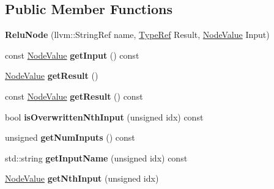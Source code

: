 \subsection*{Public Member Functions}
\begin{DoxyCompactItemize}
\item 
\mbox{\label{classglow_1_1_relu_node_a4f251464ab5d131dcda22503a07b83fc}} 
{\bfseries Relu\+Node} (llvm\+::\+String\+Ref name, \hyperlink{structglow_1_1_type}{Type\+Ref} Result, \hyperlink{structglow_1_1_node_value}{Node\+Value} Input)
\item 
\mbox{\label{classglow_1_1_relu_node_a3f6b472bb85c825b7d90bbb9b080f7a8}} 
const \hyperlink{structglow_1_1_node_value}{Node\+Value} {\bfseries get\+Input} () const
\item 
\mbox{\label{classglow_1_1_relu_node_a832e2ca58e460b8799f0ff73623217e8}} 
\hyperlink{structglow_1_1_node_value}{Node\+Value} {\bfseries get\+Result} ()
\item 
\mbox{\label{classglow_1_1_relu_node_afe05f10e495d5b8b65ca57834bde7e86}} 
const \hyperlink{structglow_1_1_node_value}{Node\+Value} {\bfseries get\+Result} () const
\item 
\mbox{\label{classglow_1_1_relu_node_ac79dd6dc45b2cd512d7a717bafae7677}} 
bool {\bfseries is\+Overwritten\+Nth\+Input} (unsigned idx) const
\item 
\mbox{\label{classglow_1_1_relu_node_aaa7d6b53681ed71d1e88ffdffa214fe7}} 
unsigned {\bfseries get\+Num\+Inputs} () const
\item 
\mbox{\label{classglow_1_1_relu_node_ae53b448653a3f2e02deee2d589294e1f}} 
std\+::string {\bfseries get\+Input\+Name} (unsigned idx) const
\item 
\mbox{\label{classglow_1_1_relu_node_a18b2c4610829e2693ef2e827ef07b680}} 
\hyperlink{structglow_1_1_node_value}{Node\+Value} {\bfseries get\+Nth\+Input} (unsigned idx)
\item 
\mbox{\label{classglow_1_1_relu_node_a95d66bf2769b00f40a46c8012e5221cd}} 

\end{DoxyCompactItemize}
